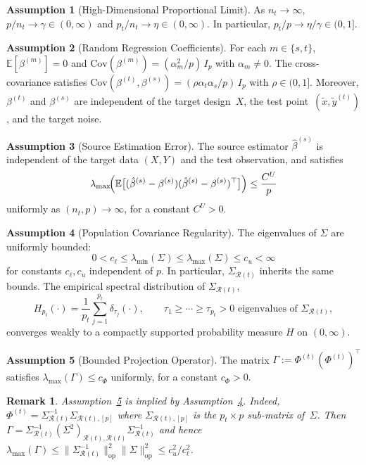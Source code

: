 \documentclass[11pt]{article}
\newtheorem{remark}[theorem]{Remark}
\theoremstyle{definition}
\newtheorem{assumption}{Assumption}[section]
\newcommand{\Rt}{\mathcal{R}(t)}
\newcommand{\Sig}{\Sigma}
\newcommand{\SigR}{\Sigma_{\Rt}}
\newcommand{\bhat}{\hat{\beta}}
\newcommand{\E}{\mathbb{E}}
\newcommand{\Cov}{\mathrm{Cov}}
\newcommand{\op}{\mathrm{op}}
\newcommand{\lmax}{\lambda_{\max}}
\newcommand{\lmin}{\lambda_{\min}}
\begin{document}
\begin{assumption}[High-Dimensional Proportional Limit]\label{as:dim}
  As $n_t\to\infty$, $p/n_t\to\gamma\in(0,\infty)$ and
  $p_t/n_t\to\eta\in(0,\infty)$.  In particular,
  $p_t/p\to\eta/\gamma\in(0,1]$.
\end{assumption}
 
\begin{assumption}[Random Regression Coefficients]\label{as:beta}
  For each $m\in\{s,t\}$,
  $\E[\beta^{(m)}]=0$ and
  $\Cov(\beta^{(m)})=(\alpha_m^2/p)\,I_p$ with $\alpha_m\neq 0$.
  The cross-covariance satisfies
  $\Cov(\beta^{(t)},\beta^{(s)})=(\rho\alpha_t\alpha_s/p)\,I_p$ with
  $\rho\in(0,1]$.
  Moreover, $\beta^{(t)}$ and $\beta^{(s)}$ are independent of the
  target design~$X$, the test point~$(\tilde x,\tilde y^{(t)})$, and the
  target noise.
\end{assumption}
 
\begin{assumption}[Source Estimation Error]\label{as:source}
  The source estimator $\bhat^{(s)}$ is independent of the target data
  $(X,Y)$ and the test observation, and satisfies
  \[
    \lmax\!\Bigl(
      \E\bigl[(\bhat^{(s)}-\beta^{(s)})
              (\bhat^{(s)}-\beta^{(s)})^\top\bigr]
    \Bigr)\le \frac{C^U}{p}
  \]
  uniformly as $(n_t,p)\to\infty$, for a constant $C^U>0$.
\end{assumption}
 
\begin{assumption}[Population Covariance Regularity]\label{as:Sigma}
  The eigenvalues of $\Sig$ are uniformly bounded:
  \[
    0<c_\ell\le\lmin(\Sig)\le\lmax(\Sig)\le c_u<\infty
  \]
  for constants $c_\ell,c_u$ independent of $p$.  In particular,
  $\SigR$ inherits the same bounds.  The empirical spectral distribution
  of $\SigR$,
  \[
    H_{p_t}(\cdot)
    =\frac{1}{p_t}\sum_{j=1}^{p_t}\delta_{\tau_j}(\cdot),
    \qquad
    \tau_1\ge\cdots\ge\tau_{p_t}>0
    \text{ eigenvalues of }\SigR,
  \]
  converges weakly to a compactly supported probability measure $H$ on
  $(0,\infty)$.
\end{assumption}
 
\begin{assumption}[Bounded Projection Operator]\label{as:Phi}
  The matrix $\Gamma:=\Phi^{(t)}(\Phi^{(t)})^\top$ satisfies
  $\lmax(\Gamma)\le c_\Phi$ uniformly, for a constant $c_\Phi>0$.
\end{assumption}
 
\begin{remark}
Assumption~\ref{as:Phi} is implied by Assumption~\ref{as:Sigma}.
Indeed, $\Phi^{(t)}=\SigR^{-1}\Sig_{\Rt,[p]}$ where
$\Sig_{\Rt,[p]}$ is the $p_t\times p$ sub-matrix of~$\Sig$.  Then
$\Gamma=\SigR^{-1}(\Sig^2)_{\Rt,\Rt}\SigR^{-1}$ and hence
$\lmax(\Gamma)\le \|\SigR^{-1}\|_{\op}^2\|\Sig\|_{\op}^2
\le c_u^2/c_\ell^2$.
\end{remark}
 
\end{document}
